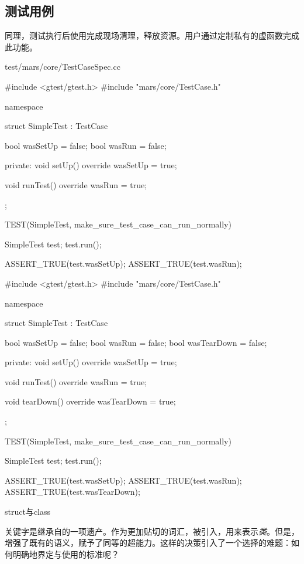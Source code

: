\begin{content}

\subsection{测试用例}

同理，测试执行后使用完成现场清理，释放资源。用户通过定制私有的虚函数完成此功能。

\newpage

\begin{diff}{test/mars/core/TestCaseSpec.cc}
 \begin{minicpp}
#include <gtest/gtest.h>
#include "mars/core/TestCase.h"

namespace {
  struct SimpleTest : TestCase {
    bool wasSetUp = false;
    bool wasRun = false;

  private:
    void setUp() override {
      wasSetUp = true;
    }

    void runTest() override {
      wasRun = true;
    }
  };
}

TEST(SimpleTest, make_sure_test_case_can_run_normally) {
  SimpleTest test;
  test.run();

  ASSERT_TRUE(test.wasSetUp);
  ASSERT_TRUE(test.wasRun);
}
 \end{minicpp}
\tcblower
 \begin{minicpp}
#include <gtest/gtest.h>
#include "mars/core/TestCase.h"

namespace {
  struct SimpleTest : TestCase {
    bool wasSetUp = false;
    bool wasRun = false;
    bool wasTearDown = false;

  private:
    void setUp() override {
      wasSetUp = true;
    }

    void runTest() override {
      wasRun = true;
    }

    void tearDown() override {
      wasTearDown = true;
    }
  };
}

TEST(SimpleTest, make_sure_test_case_can_run_normally) {
  SimpleTest test;
  test.run();

  ASSERT_TRUE(test.wasSetUp);
  ASSERT_TRUE(test.wasRun);
  ASSERT_TRUE(test.wasTearDown);  
}
 \end{minicpp} 
\end{diff}

\begin{episode}{struct与class}
\begin{content}

关键字是\cpp{}继承自\clang{}的一项遗产。作为更加贴切的词汇，被引入\cpp{}，用来表示\emph{类}。但是，\cpp{}增强了既有的语义，赋予了同等的超能力。这样的决策引入了一个选择的难题：如何明确地界定与使用的标准呢？


\end{content}
\end{episode}
\end{content}
